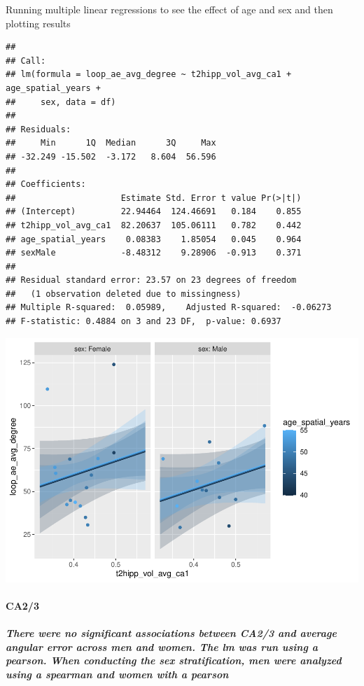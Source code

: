 \documentclass[
]{article}
\begin{document}
\vspace{1cm}

Running multiple linear regressions to see the effect of age and sex and
then plotting results

\begin{verbatim}
## 
## Call:
## lm(formula = loop_ae_avg_degree ~ t2hipp_vol_avg_ca1 + age_spatial_years + 
##     sex, data = df)
## 
## Residuals:
##     Min      1Q  Median      3Q     Max 
## -32.249 -15.502  -3.172   8.604  56.596 
## 
## Coefficients:
##                     Estimate Std. Error t value Pr(>|t|)
## (Intercept)         22.94464  124.46691   0.184    0.855
## t2hipp_vol_avg_ca1  82.20637  105.06111   0.782    0.442
## age_spatial_years    0.08383    1.85054   0.045    0.964
## sexMale             -8.48312    9.28906  -0.913    0.371
## 
## Residual standard error: 23.57 on 23 degrees of freedom
##   (1 observation deleted due to missingness)
## Multiple R-squared:  0.05989,    Adjusted R-squared:  -0.06273 
## F-statistic: 0.4884 on 3 and 23 DF,  p-value: 0.6937
\end{verbatim}

\includegraphics{hippocampal_subfield_files/figure-latex/Avg CA1 + avg angular error MLR-1.pdf}

\newpage
\paragraph{CA2/3}

\subparagraph{There were no significant associations between CA2/3 and average angular error across men and women. The lm was run using a pearson. When conducting the sex stratification, men were analyzed using a spearman and women with a pearson}
\end{document}
